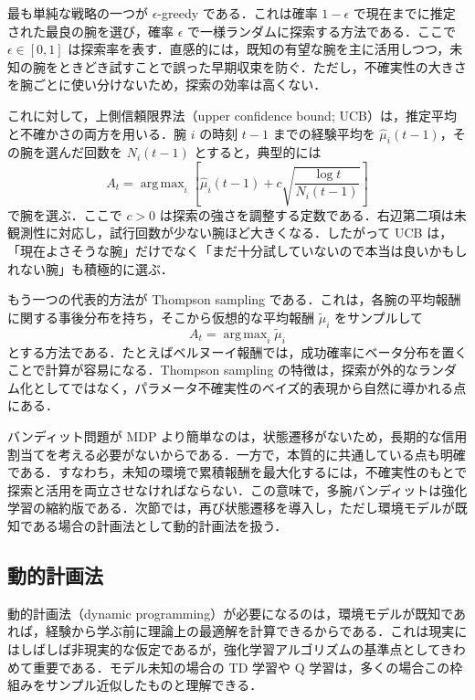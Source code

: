 最も単純な戦略の一つが $\epsilon$-greedy である．これは確率 $1-\epsilon$ で現在までに推定された最良の腕を選び，確率 $\epsilon$ で一様ランダムに探索する方法である．ここで $\epsilon \in [0,1]$ は探索率を表す．直感的には，既知の有望な腕を主に活用しつつ，未知の腕をときどき試すことで誤った早期収束を防ぐ．ただし，不確実性の大きさを腕ごとに使い分けないため，探索の効率は高くない．

これに対して，上側信頼限界法（upper confidence bound; UCB）は，推定平均と不確かさの両方を用いる\cite{Auer2002}．腕 $i$ の時刻 $t-1$ までの経験平均を $\hat{\mu}_i(t-1)$，その腕を選んだ回数を $N_i(t-1)$ とすると，典型的には
\begin{equation*}
A_t
=
\mathop{\mathrm{arg\,max}}_i
\left[
\hat{\mu}_i(t-1)
+
c \sqrt{\frac{\log t}{N_i(t-1)}}
\right]
\end{equation*}
で腕を選ぶ．ここで $c>0$ は探索の強さを調整する定数である．右辺第二項は未観測性に対応し，試行回数が少ない腕ほど大きくなる．したがって UCB は，「現在よさそうな腕」だけでなく「まだ十分試していないので本当は良いかもしれない腕」も積極的に選ぶ．

もう一つの代表的方法が Thompson sampling である\cite{Thompson1933}．これは，各腕の平均報酬に関する事後分布を持ち，そこから仮想的な平均報酬 $\tilde{\mu}_i$ をサンプルして
\begin{equation*}
A_t = \mathop{\mathrm{arg\,max}}_i \tilde{\mu}_i
\end{equation*}
とする方法である．たとえばベルヌーイ報酬では，成功確率にベータ分布を置くことで計算が容易になる．Thompson sampling の特徴は，探索が外的なランダム化としてではなく，パラメータ不確実性のベイズ的表現から自然に導かれる点にある．

バンディット問題が MDP より簡単なのは，状態遷移がないため，長期的な信用割当てを考える必要がないからである．一方で，本質的に共通している点も明確である．すなわち，未知の環境で累積報酬を最大化するには，不確実性のもとで探索と活用を両立させなければならない．この意味で，多腕バンディットは強化学習の縮約版である．次節では，再び状態遷移を導入し，ただし環境モデルが既知である場合の計画法として動的計画法を扱う．

\subsection{動的計画法}

動的計画法（dynamic programming）が必要になるのは，環境モデルが既知であれば，経験から学ぶ前に理論上の最適解を計算できるからである．これは現実にはしばしば非現実的な仮定であるが，強化学習アルゴリズムの基準点としてきわめて重要である．モデル未知の場合の TD 学習や Q 学習は，多くの場合この枠組みをサンプル近似したものと理解できる．

